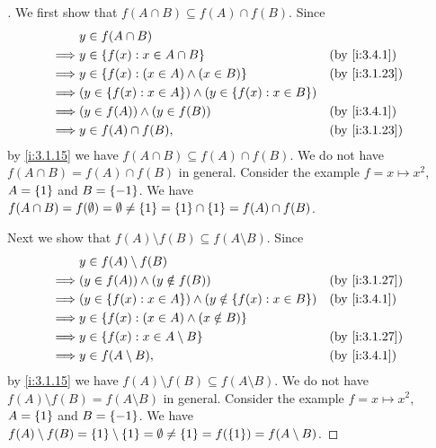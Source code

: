 \begin{proof}[]
  We first show that \(f(A \cap B) \subseteq f(A) \cap f(B)\).
  Since
  \begin{align*}
             & y \in f(A \cap B)                                                                        \\
    \implies & y \in \set{f(x) : x \in A \cap B}                                     &  & \by{i:3.4.1}  \\
    \implies & y \in \set{f(x) : (x \in A) \land (x \in B)}                          &  & \by{i:3.1.23} \\
    \implies & \pa{y \in \set{f(x) : x \in A}} \land \pa{y \in \set{f(x) : x \in B}}                    \\
    \implies & (y \in f(A)) \land (y \in f(B))                                       &  & \by{i:3.4.1}  \\
    \implies & y \in f(A) \cap f(B),                                                 &  & \by{i:3.1.23}
  \end{align*}
  by \cref{i:3.1.15} we have \(f(A \cap B) \subseteq f(A) \cap f(B)\).
  We do not have \(f(A \cap B) = f(A) \cap f(B)\) in general.
  Consider the example \(f = x \mapsto x^2\), \(A = \left\lbrace1\right\rbrace\) and \(B = \left\lbrace-1\right\rbrace\).
  We have \(f(A \cap B) = f(\emptyset) = \emptyset \neq \left\lbrace1\right\rbrace = \left\lbrace1\right\rbrace \cap \left\lbrace1\right\rbrace = f(A) \cap f(B)\).

  Next we show that \(f(A) \setminus f(B) \subseteq f(A \setminus B)\).
  Since
  \begin{align*}
             & y \in f(A) \setminus f(B)                                                                   \\
    \implies & (y \in f(A)) \land (y \notin f(B))                                       &  & \by{i:3.1.27} \\
    \implies & \pa{y \in \set{f(x) : x \in A}} \land \pa{y \notin \set{f(x) : x \in B}} &  & \by{i:3.4.1}  \\
    \implies & y \in \set{f(x) : (x \in A) \land (x \notin B)}                                             \\
    \implies & y \in \set{f(x) : x \in A \setminus B}                                   &  & \by{i:3.1.27} \\
    \implies & y \in f(A \setminus B),                                                  &  & \by{i:3.4.1}
  \end{align*}
  by \cref{i:3.1.15} we have \(f(A) \setminus f(B) \subseteq f(A \setminus B)\).
  We do not have \(f(A) \setminus f(B) = f(A \setminus B)\) in general.
  Consider the example \(f = x \mapsto x^2\), \(A = \left\lbrace1\right\rbrace\) and \(B = \left\lbrace-1\right\rbrace\).
  We have \(f(A) \setminus f(B) = \left\lbrace1\right\rbrace \setminus \left\lbrace1\right\rbrace = \emptyset \neq \left\lbrace1\right\rbrace = f(\left\lbrace1\right\rbrace) = f(A \setminus B)\).


\end{proof}
